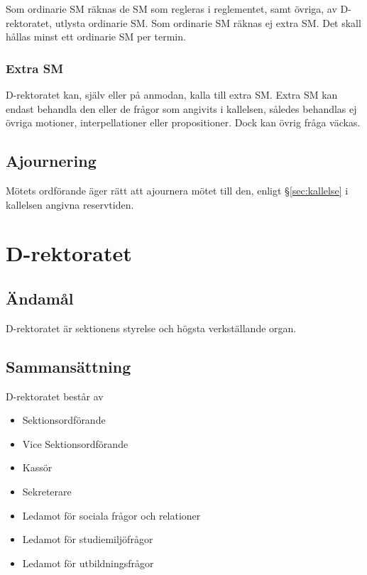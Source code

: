 \documentclass{dgovdoc}
\begin{document}
Som ordinarie SM räknas de SM som regleras i reglementet, samt övriga, av
D-rektoratet, utlysta ordinarie SM. Som ordinarie SM räknas ej extra SM. Det
skall hållas minst ett ordinarie SM per termin.

\subsubsection{Extra SM}

D-rektoratet kan, själv eller på anmodan, kalla till extra SM. Extra SM kan
endast behandla den eller de frågor som angivits i kallelsen, således behandlas
ej övriga motioner, interpellationer eller propositioner. Dock kan övrig fråga
väckas.

\subsection{Ajournering}
\label{sec:ajournering}

Mötets ordförande äger rätt att ajournera mötet till den, enligt 
\S\ref{sec:kallelse} i kallelsen angivna reservtiden.

\section{D-rektoratet}

\subsection{Ändamål}

D-rektoratet är sektionens styrelse och högsta verkställande organ.

\subsection{Sammansättning}

D-rektoratet består av

\begin{itemize}
  \item Sektionsordförande
  \item Vice Sektionsordförande
  \item Kassör
  \item Sekreterare
  \item Ledamot för sociala frågor och relationer
  \item Ledamot för studiemiljöfrågor
  \item Ledamot för utbildningsfrågor
\end{itemize}
\end{document}
